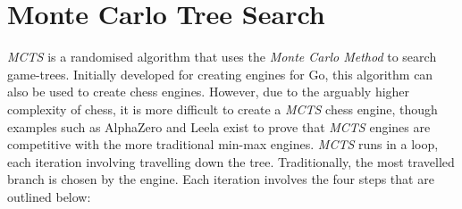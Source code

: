 \chapter{Monte Carlo Tree Search}
\textit{MCTS} is a randomised algorithm that uses the \textit{Monte Carlo Method} to search game-trees. Initially developed for creating engines for Go, this algorithm can also be used to create chess engines. However, due to the arguably higher complexity of chess, it is more difficult to create a \textit{MCTS} chess engine, though examples such as AlphaZero and Leela exist to prove that \textit{MCTS} engines are competitive with the more traditional min-max engines. 
\textit{MCTS} runs in a loop, each iteration involving travelling down the tree. Traditionally, the most travelled branch is chosen by the engine. Each iteration involves the four steps that are outlined below:
